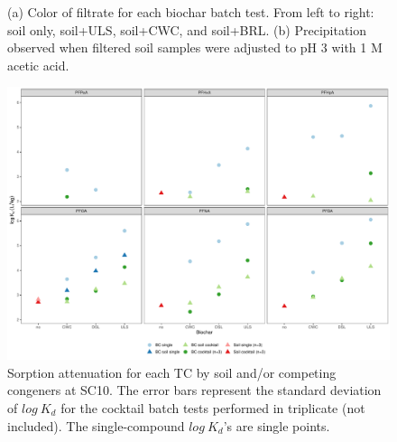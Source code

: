 \begin{figure}[htb]
\hfill
{}
\caption{(a) Color of filtrate for each biochar batch test. From left to right: soil only, soil+ULS, soil+CWC, and soil+BRL. (b) Precipitation observed when filtered soil samples were adjusted to pH 3 with 1 M acetic acid.}
\label{fig:DOC_tubes}
\end{figure}


\begin{figure}[htb]
    \centering
    \includegraphics[width=\textwidth]{R/figs/C10.pdf}
    \caption{Sorption attenuation for each TC by soil and/or competing congeners at SC10. The error bars represent the standard deviation of $log~K_d$ for the cocktail batch tests performed in triplicate (not included). The single-compound $log~K_d$'s are single points.}
    \label{fig:C10}
\end{figure}

